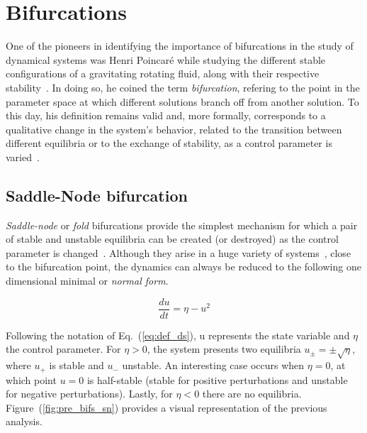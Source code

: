 \section{Bifurcations}

One of the pioneers in identifying the importance of bifurcations in the study of dynamical systems
was Henri Poincaré while studying the different stable
configurations of a gravitating rotating fluid, along with their respective stability~\cite{poincare1885equilibre}. 
In doing so, he coined the
term {\em bifurcation}, refering to the point in the parameter space at which different solutions branch off from another solution.
To this day, his definition remains valid and, more formally, corresponds to a qualitative change 
in the system's behavior, related to the transition between different equilibria or to the exchange of stability,
as a control parameter is varied~\cite{strogatz2018nonlinear}.



\subsection{Saddle-Node bifurcation}

{\em Saddle-node} or {\em fold} bifurcations provide the simplest mechanism 
for which a pair of stable and unstable equilibria can be created (or destroyed) 
as the control parameter is changed~\cite{strogatz2018nonlinear}. Although they 
arise in a huge variety of systems~\cite{Jackson_1989}, close to the bifurcation 
point, the dynamics can always be reduced to
the following one dimensional minimal or {\em normal form}.

\begin{equation}
    \dfrac{du}{dt} = \eta - u^2
    \label{eq:pre_bif_sn}
\end{equation}

Following the notation of Eq.~(\ref{eq:def_ds}), u represents the state variable
and $\eta$ the control parameter. For $\eta > 0$, the system presents two equilibria $u_{\pm} = \pm\sqrt{\eta}$, where $u_+$ is
stable and $u_-$ unstable. An interesting case occurs when $\eta = 0$, at which point $u = 0$ is
half-stable (stable for positive perturbations and unstable for negative perturbations). Lastly,
for $\eta < 0$ there are no equilibria. Figure~(\ref{fig:pre_bifs_sn}) provides a visual representation
of the previous analysis.

